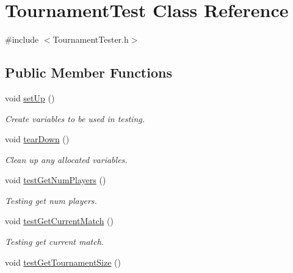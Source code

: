 \hypertarget{classTournamentTest}{
\section{TournamentTest Class Reference}
\label{classTournamentTest}
}


{\ttfamily \#include $<$TournamentTester.h$>$}\subsection*{Public Member Functions}
\begin{DoxyCompactItemize}
\item 
\hypertarget{classTournamentTest_a3233b27bf8d8dd657239b8c841b7b029}{
void \hyperlink{classTournamentTest_a3233b27bf8d8dd657239b8c841b7b029}{setUp} ()}
\label{classTournamentTest_a3233b27bf8d8dd657239b8c841b7b029}

\begin{DoxyCompactList}\small\item\em Create variables to be used in testing. \item\end{DoxyCompactList}\item 
\hypertarget{classTournamentTest_a30942600b637d9399ac8bb90df12e279}{
void \hyperlink{classTournamentTest_a30942600b637d9399ac8bb90df12e279}{tearDown} ()}
\label{classTournamentTest_a30942600b637d9399ac8bb90df12e279}

\begin{DoxyCompactList}\small\item\em Clean up any allocated variables. \item\end{DoxyCompactList}\item 
void \hyperlink{classTournamentTest_acabeb35b05c90cb7e622e75704820422}{testGetNumPlayers} ()
\begin{DoxyCompactList}\small\item\em Testing get num players. \item\end{DoxyCompactList}\item 
\hypertarget{classTournamentTest_a9c53677756ef362f8b822a3e3dfa48bc}{
void \hyperlink{classTournamentTest_a9c53677756ef362f8b822a3e3dfa48bc}{testGetCurrentMatch} ()}
\label{classTournamentTest_a9c53677756ef362f8b822a3e3dfa48bc}

\begin{DoxyCompactList}\small\item\em Testing get current match. \item\end{DoxyCompactList}\item 
\hypertarget{classTournamentTest_ad38de1d8a2ce32a95fab531162da2475}{
void \hyperlink{classTournamentTest_ad38de1d8a2ce32a95fab531162da2475}{testGetTournamentSize} ()}
\label{classTournamentTest_ad38de1d8a2ce32a95fab531162da2475}


\end{DoxyCompactItemize}
